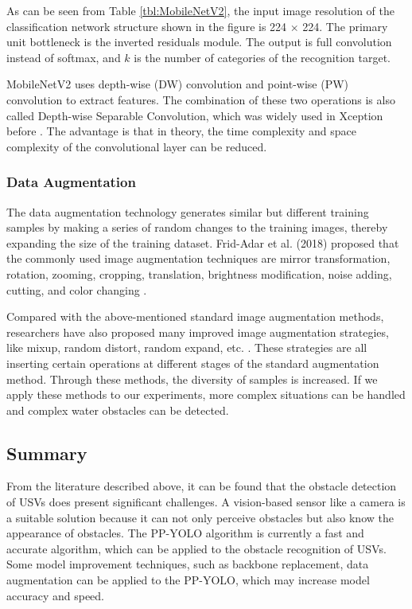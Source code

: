 \documentclass[sensors,article,submit,moreauthors,pdftex]{Definitions/mdpi}
\begin{document}
As can be seen from Table \ref{tbl:MobileNetV2}, the input image resolution of the classification network structure shown in the figure is 224 $\times$ 224. The primary unit bottleneck is the inverted residuals module. The output is full convolution instead of softmax, and $k$ is the number of categories of the recognition target.

MobileNetV2 uses depth-wise (DW) convolution and point-wise (PW) convolution to extract features. The combination of these two operations is also called Depth-wise Separable Convolution, which was widely used in Xception before \cite{sandler2018mobilenetv2}. The advantage is that in theory, the time complexity and space complexity of the convolutional layer can be reduced.

\subsubsection{Data Augmentation}

The data augmentation technology generates similar but different training samples by making a series of random changes to the training images, thereby expanding the size of the training dataset. Frid-Adar et al. (2018) proposed that the commonly used image augmentation techniques are mirror transformation, rotation, zooming, cropping, translation, brightness modification, noise adding, cutting, and color changing \cite{frid2018gan}.

Compared with the above-mentioned standard image augmentation methods, researchers have also proposed many improved image augmentation strategies, like mixup, random distort, random expand, etc. \cite{cubuk2018autoaugment, devries2017improved}. These strategies are all inserting certain operations at different stages of the standard augmentation method. Through these methods, the diversity of samples is increased. If we apply these methods to our experiments, more complex situations can be handled and complex water obstacles can be detected.

\subsection{Summary}

From the literature described above, it can be found that the obstacle detection of USVs does present significant challenges. A vision-based sensor like a camera is a suitable solution because it can not only perceive obstacles but also know the appearance of obstacles. The PP-YOLO algorithm is currently a fast and accurate algorithm, which can be applied to the obstacle recognition of USVs. Some model improvement techniques, such as 
backbone replacement, data augmentation can be applied to the PP-YOLO, which may increase model accuracy and speed.
\end{document}
